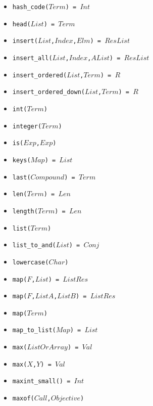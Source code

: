 \documentclass[10pt]{article}
\begin{document}
\begin{multicols}{2}
\begin{scriptsize}
\begin{itemize}
    \item \texttt{hash\_code($Term$) = $Int$} 
    \item \texttt{head($List$) = $Term$} 
    \item \texttt{insert($List$,$Index$,$Elm$) = $ResList$} 
    \item \texttt{insert\_all($List$,$Index$,$AList$) = $ResList$} 
    \item \texttt{insert\_ordered($List$,$Term$) = $R$} 
    \item \texttt{insert\_ordered\_down($List$,$Term$) = $R$} 
    \item \texttt{int($Term$)} 
    \item \texttt{integer($Term$)} 
    \item \texttt{is($Exp$,$Exp$)} 
    \item \texttt{keys($Map$) = $List$} 
    \item \texttt{last($Compound$) = $Term$} 
    \item \texttt{len($Term$) = $Len$} 
    \item \texttt{length($Term$) = $Len$} 
    \item \texttt{list($Term$)} 
    \item \texttt{list\_to\_and($List$) = $Conj$}
    \item \texttt{lowercase($Char$)} 
    \item \texttt{map($F$,$List$) = $ListRes$} 
    \item \texttt{map($F$,$ListA$,$ListB$) = $ListRes$} 
    \item \texttt{map($Term$)} 
    \item \texttt{map\_to\_list($Map$) = $List$} 
    \item \texttt{max($ListOrArray$) = $Val$} 
    \item \texttt{max($X$,$Y$) = $Val$} 
    \item \texttt{maxint\_small() = $Int$}
    \item \texttt{maxof($Call$,$Objective$)} 

\end{itemize}
\end{scriptsize}
\end{multicols}
\end{document}
